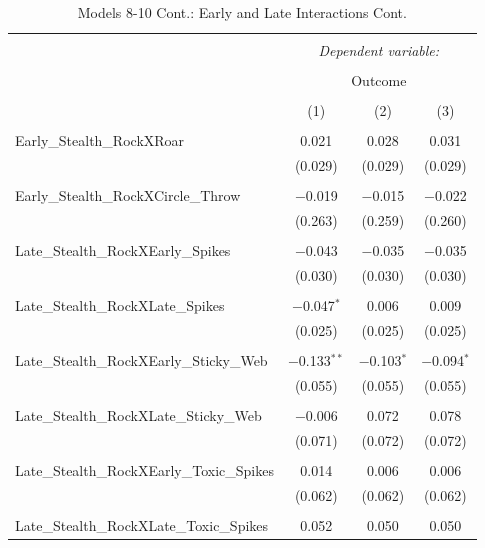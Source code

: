 \documentclass[12pt,twoside]{reedthesis}
\begin{document}
  \begin{table}[!htbp] \centering 
    \caption{Models 8-10 Cont.: Early and Late Interactions Cont.} 
    \label{} 
  \begin{tabular}{@{\extracolsep{5pt}}lccc} 
  \\[-1.8ex]\hline 
  \hline \\[-1.8ex] 
   & \multicolumn{3}{c}{\textit{Dependent variable:}} \\ 
  \cline{2-4} 
  \\[-1.8ex] & \multicolumn{3}{c}{Outcome} \\ 
  \\[-1.8ex] & (1) & (2) & (3)\\ 
  \hline \\[-1.8ex] 
   Early\_Stealth\_RockXRoar & 0.021 & 0.028 & 0.031 \\ 
    & (0.029) & (0.029) & (0.029) \\ 
    & & & \\ 
   Early\_Stealth\_RockXCircle\_Throw & $-$0.019 & $-$0.015 & $-$0.022 \\ 
    & (0.263) & (0.259) & (0.260) \\ 
    & & & \\ 
   Late\_Stealth\_RockXEarly\_Spikes & $-$0.043 & $-$0.035 & $-$0.035 \\ 
    & (0.030) & (0.030) & (0.030) \\ 
    & & & \\ 
   Late\_Stealth\_RockXLate\_Spikes & $-$0.047$^{*}$ & 0.006 & 0.009 \\ 
    & (0.025) & (0.025) & (0.025) \\ 
    & & & \\ 
   Late\_Stealth\_RockXEarly\_Sticky\_Web & $-$0.133$^{**}$ & $-$0.103$^{*}$ & $-$0.094$^{*}$ \\ 
    & (0.055) & (0.055) & (0.055) \\ 
    & & & \\ 
   Late\_Stealth\_RockXLate\_Sticky\_Web & $-$0.006 & 0.072 & 0.078 \\ 
    & (0.071) & (0.072) & (0.072) \\ 
    & & & \\ 
   Late\_Stealth\_RockXEarly\_Toxic\_Spikes & 0.014 & 0.006 & 0.006 \\ 
    & (0.062) & (0.062) & (0.062) \\ 
    & & & \\ 
   Late\_Stealth\_RockXLate\_Toxic\_Spikes & 0.052 & 0.050 & 0.050 \\ 

\end{tabular}
\end{table}
\end{document}
